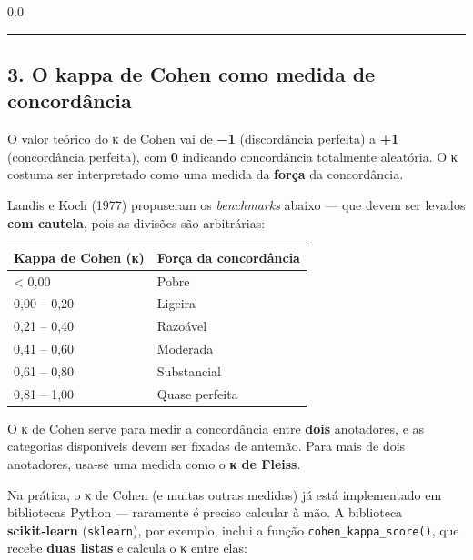 \documentclass[
  brazilian,
  11pt,
]{article}
\newenvironment{Shaded}{\begin{snugshade}}{\end{snugshade}}
\newcommand{\NormalTok}[1]{\textcolor[rgb]{0.81,0.81,0.76}{#1}}
\newcounter{none} %
\let\oldtexttt\texttt
\renewcommand{\texttt}[1]{{\color{inlink}\oldtexttt{#1}}}
\begin{document}
\begin{Shaded}
\begin{Highlighting}[]
\NormalTok{0.0}
\end{Highlighting}
\end{Shaded}

\begin{center}\rule{0.5\linewidth}{0.5pt}\end{center}

\subsection{3. O kappa de Cohen como medida de
concordância}\label{o-kappa-de-cohen-como-medida-de-concorduxe2ncia}

O valor teórico do κ de Cohen vai de \textbf{−1} (discordância perfeita)
a \textbf{+1} (concordância perfeita), com \textbf{0} indicando
concordância totalmente aleatória. O κ costuma ser interpretado como uma
medida da \textbf{força} da concordância.

Landis e Koch (1977) propuseram os \emph{benchmarks} abaixo --- que
devem ser levados \textbf{com cautela}, pois as divisões são
arbitrárias:

{\def\LTcaptype{none} %
\begin{longtable}[]{@{}ll@{}}
\toprule\noalign{}
Kappa de Cohen (κ) & Força da concordância \\
\midrule\noalign{}
\endhead
\bottomrule\noalign{}
\endlastfoot
\textless{} 0,00 & Pobre \\
0,00 -- 0,20 & Ligeira \\
0,21 -- 0,40 & Razoável \\
0,41 -- 0,60 & Moderada \\
0,61 -- 0,80 & Substancial \\
0,81 -- 1,00 & Quase perfeita \\
\end{longtable}
}

O κ de Cohen serve para medir a concordância entre \textbf{dois}
anotadores, e as categorias disponíveis devem ser fixadas de antemão.
Para mais de dois anotadores, usa‑se uma medida como o \textbf{κ de
Fleiss}.

Na prática, o κ de Cohen (e muitas outras medidas) já está implementado
em bibliotecas Python --- raramente é preciso calcular à mão. A
biblioteca \textbf{scikit‑learn} (\texttt{sklearn}), por exemplo, inclui
a função \texttt{cohen\_kappa\_score()}, que recebe \textbf{duas listas}
e calcula o κ entre elas:
\end{document}
